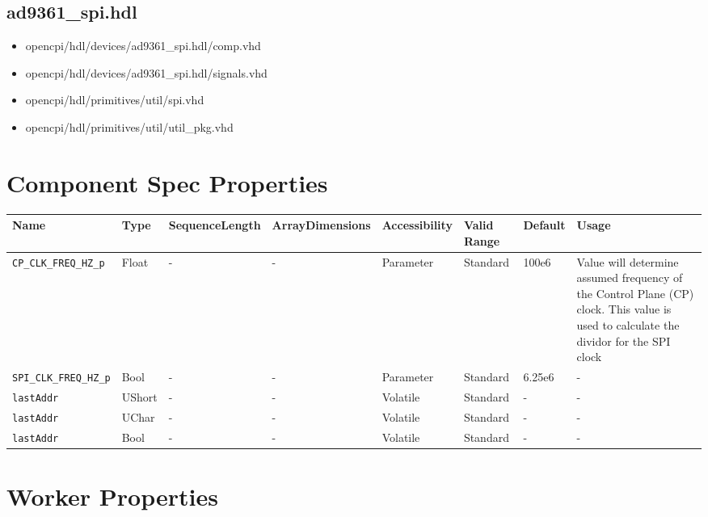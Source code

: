 \documentclass{article}
\def\comp{ad9361\_spi}
\begin{document}
\subsection*{\comp.hdl}
\begin{itemize}
	\item opencpi/hdl/devices/\comp{}.hdl/comp{}.vhd
	\item opencpi/hdl/devices/\comp{}.hdl/signals.vhd	
	\item opencpi/hdl/primitives/util/spi.vhd
	\item opencpi/hdl/primitives/util/util\_pkg.vhd
\end{itemize}
\begin{landscape}

	\section*{Component Spec Properties}
	\begin{scriptsize}
		\begin{tabular}{|p{3.75cm}|p{1.25cm}|p{2cm}|p{2.75cm}|p{1.5cm}|p{1.5cm}|p{1cm}|p{5.25cm}|}
			\hline
			\rowcolor{blue}
			Name               & Type & SequenceLength & ArrayDimensions & Accessibility      & Valid Range & Default & Usage                                                                               \\
			\hline
			\verb+CP_CLK_FREQ_HZ_p+ & Float & -              & -               & Parameter  & Standard    & 100e6   & Value will determine assumed frequency of the Control Plane (CP) clock. This value is used to calculate the dividor for the SPI clock              \\
			\hline
			\verb+SPI_CLK_FREQ_HZ_p+ & Bool & -              & -               & Parameter & Standard    & 6.25e6  & - \\
			\hline
			\verb+lastAddr+ & UShort & -              & -               & Volatile & Standard    & - & - \\
			\hline
			\verb+lastAddr+ & UChar & -              & -               & Volatile & Standard    & - & - \\
			\hline
			\verb+lastAddr+ & Bool & -              & -               & Volatile & Standard    & - & - \\
			\hline
		\end{tabular}
	\end{scriptsize}

	\section*{Worker Properties}

\end{landscape}
\end{document}
